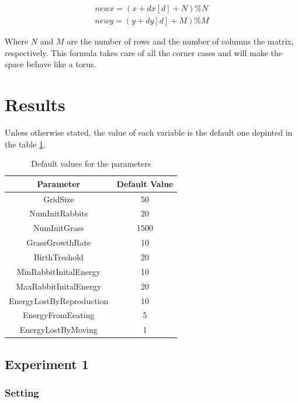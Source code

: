 \documentclass[11pt]{article}
\begin{document}
\begin{gather*} 
newx = (x + dx[d] + N) \% N \\
newy = (y + dy[d] + M) \% M
\end{gather*}

Where $N$ and $M$ are the number of rows and the number of columns the matrix, respectively. This formula takes care of all the corner cases and will make the space behave like a torus.


\section{Results}

Unless otherwise stated, the value of each variable is the default one depinted in the table \ref{table:constants}.

\begin{table}[h!]
\centering
\begin{tabular}{||c c||} 
 \hline
 Parameter & Default Value \\ [0.5ex] 
 \hline\hline
  GridSize & 50 \\
  NumInitRabbits & 20 \\
  NumInitGrass & 1500 \\
  GrassGrowthRate & 10 \\
  BirthTreshold & 20 \\
  MinRabbitInitalEnergy & 10 \\
  MaxRabbitInitalEnergy & 20 \\
  EnergyLostByReproduction & 10 \\
  EnergyFromEeating & 5 \\
  EnergyLostByMoving & 1 \\
 \hline
\end{tabular}
\caption{Default values for the parameters}
\label{table:constants}
\end{table}

\subsection{Experiment 1}

\subsubsection{Setting}
\end{document}
